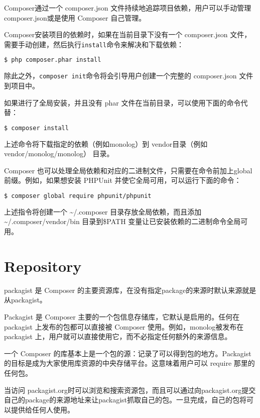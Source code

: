 Composer通过一个 composer.json 文件持续地追踪项目依赖，用户可以手动管理composer.json或是使用 Composer 自己管理。

Composer安装项目的依赖时，如果在当前目录下没有一个 composer.json 文件，需要手动创建，然后执行\texttt{install}命令来解决和下载依赖：


\begin{lstlisting}[language=bash]
$ php composer.phar install
\end{lstlisting}

除此之外，\texttt{composer init}命令将会引导用户创建一个完整的 composer.json 文件到项目中。

如果进行了全局安装，并且没有 phar 文件在当前目录，可以使用下面的命令代替：

\begin{lstlisting}[language=bash]
$ composer install
\end{lstlisting}

上述命令将下载指定的依赖（例如monolog）到 vendor目录（例如vendor/monolog/monolog） 目录。

Composer 也可以处理全局依赖和对应的二进制文件，只需要在命令前加上global前缀。例如，如果想安装 PHPUnit 并使它全局可用，可以运行下面的命令：

\begin{lstlisting}[language=bash]
$ composer global require phpunit/phpunit
\end{lstlisting}

上述指令将创建一个 \~{}/.composer 目录存放全局依赖，而且添加\~{}/.composer/vendor/bin 目录到\$PATH 变量让已安装依赖的二进制命令全局可用。


\section{Repository}

packagist 是 Composer 的主要资源库，在没有指定package的来源时默认来源就是从packagist。

Packagist 是 Composer 主要的一个包信息存储库，它默认是启用的。任何在 packagist 上发布的包都可以直接被 Composer 使用。例如，monolog被发布在 packagist 上，用户就可以直接使用它，而不必指定任何额外的来源信息。

一个 Composer 的库基本上是一个包的源：记录了可以得到包的地方。Packagist 的目标是成为大家使用库资源的中央存储平台。这意味着用户可以 require 那里的任何包。

当访问 packagist.org时可以浏览和搜索资源包，而且可以通过向packagist.org提交自己的package的来源地址来让packagist抓取自己的包。一旦完成，自己的包将可以提供给任何人使用。

